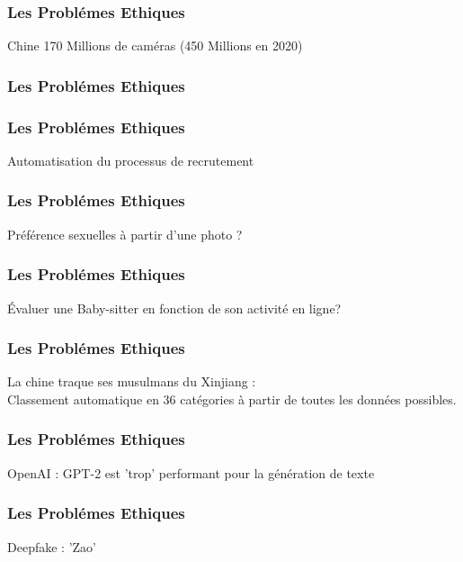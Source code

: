\documentclass{formation}
\begin{document}
\begin{frame}
  \frametitle{Les Problémes Ethiques}
  Chine 170 Millions de caméras (450 Millions en 2020)
  \begin{minipage}[c]{0.49\linewidth}
  \end{minipage}\hfill
  \begin{minipage}[c]{0.49\linewidth}
  \end{minipage}\hfill
\end{frame}

\begin{frame}
  \frametitle{Les Problémes Ethiques}
\end{frame}

\begin{frame}
  \frametitle{Les Problémes Ethiques}
  Automatisation du processus de recrutement
\end{frame}

\begin{frame}
  \frametitle{Les Problémes Ethiques}
  Préférence sexuelles à partir d'une photo ?
\end{frame}

\begin{frame}
  \frametitle{Les Problémes Ethiques}
  Évaluer une Baby-sitter en fonction de son activité en ligne?
\end{frame}

\begin{frame}
  \frametitle{Les Problémes Ethiques}
  La chine traque ses musulmans du Xinjiang :\\
  Classement automatique en 36 catégories à partir de toutes les données possibles.
\end{frame}

\begin{frame}
  \frametitle{Les Problémes Ethiques}
  OpenAI : GPT-2 est 'trop' performant pour la génération de texte
\end{frame}

\begin{frame}
  \frametitle{Les Problémes Ethiques}
  Deepfake : 'Zao'
\end{frame}
\end{document}
